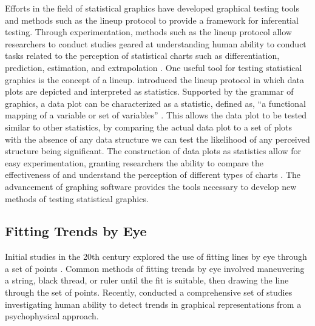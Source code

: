 \documentclass[12pt]{article}
\begin{document}
Efforts in the field of statistical graphics have developed graphical
testing tools and methods such as the lineup protocol
\citep{buja2009statistical} to provide a framework for inferential
testing. Through experimentation, methods such as the lineup protocol
allow researchers to conduct studies geared at understanding human
ability to conduct tasks related to the perception of statistical charts
such as differentiation, prediction, estimation, and extrapolation
\citep{vanderplas2017clusters, vanderplas2015spatial, hofmann2012graphical}.
One useful tool for testing statistical graphics is the concept of a
lineup. \citet{buja2009statistical} introduced the lineup protocol in
which data plots are depicted and interpreted as statistics. Supported
by the grammar of graphics, a data plot can be characterized as a
statistic, defined as, ``a functional mapping of a variable or set of
variables'' \citep{vanderplas2020testing}. This allows the data plot to
be tested similar to other statistics, by comparing the actual data plot
to a set of plots with the absence of any data structure we can test the
likelihood of any perceived structure being significant. The
construction of data plots as statistics allow for easy experimentation,
granting researchers the ability to compare the effectiveness of and
understand the perception of different types of charts
\citep{vanderplas2017clusters, vanderplas2015spatial, hofmann2012graphical}.
The advancement of graphing software provides the tools necessary to
develop new methods of testing statistical graphics.

\hypertarget{fitting-trends-by-eye}{%
\subsection{Fitting Trends by Eye}\label{fitting-trends-by-eye}}

Initial studies in the 20th century explored the use of fitting lines by
eye through a set of points
\citep{finney1951subjective, mosteller1981eye}. Common methods of
fitting trends by eye involved maneuvering a string, black thread, or
ruler until the fit is suitable, then drawing the line through the set
of points. Recently, \citet{ciccione2021can} conducted a comprehensive
set of studies investigating human ability to detect trends in graphical
representations from a psychophysical approach.
\end{document}
